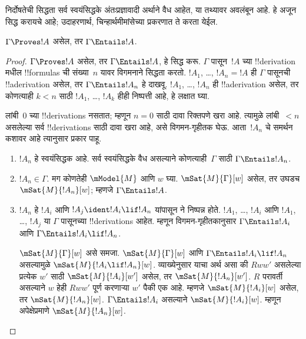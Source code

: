 \documentclass[../../../include/open-logic-section]{subfiles}
\begin{document}


\begin{editorial}
  निर्दोषतेची सिद्धता सर्व स्वयंसिद्धके
  अंतःप्रज्ञावादी अर्थाने वैध आहेत, या
  तथ्यावर अवलंबून आहे. हे अजून सिद्ध
  करायचे आहे; उदाहरणार्थ, चिन्हार्थमीमांसेच्या
  प्रकरणात ते करता येईल.
\end{editorial}

\begin{thm}[निर्दोषता]
  $\Gamma \Proves !A$ असेल, तर
  $ \Gamma \Entails !A$.
\end{thm}

\begin{proof}
  $\Gamma \Proves !A$ असेल, तर
  $\Gamma \Entails !A$, हे सिद्ध करू.
  $\Gamma$ पासून~$!A$ च्या
  !!{derivation} मधील !!{formula}s ची
  संख्या~$n$ यावर विगमनाने सिद्धता करतो.
  $!A_1$, \dots, $!A_n = !A$ ही
  $\Gamma$ पासूनची !!a{derivation} असेल,
  तर $\Gamma \Entails !A_n$ हे दाखवू.
  $!A_1$, \dots, $!A_n$ ही
  !!a{derivation} असेल, तर कोणत्याही $k<n$
  साठी $!A_1$, \dots, $!A_k$ हीही
  निष्पत्ती आहे, हे लक्षात घ्या.

  लांबी~$0$ च्या !!{derivation}s नसतात; म्हणून
  $n=0$ साठी दावा रिक्तपणे खरा आहे.
  त्यामुळे लांबी~$<n$ असलेल्या सर्व
  !!{derivation}s साठी दावा खरा आहे, असे
  विगमन-गृहीतक घेऊ. आता~$!A_n$ चे
  समर्थन कशावर आहे त्यानुसार प्रकार पाहू.

  \begin{enumerate}
  \item $!A_n$ हे स्वयंसिद्धक आहे.
    सर्व स्वयंसिद्धके वैध असल्याने कोणत्याही~$\Gamma$
    साठी $\Gamma \Entails
    !A_n$.
  \item $!A_n \in \Gamma$. मग कोणतेही
    $\mModel{M}$ आणि $w$ घ्या.
    $\mSat{M}{\Gamma}[w]$ असेल, तर उघडच
    $\mSat{M}{!A_n}[w]$; म्हणजे
    $\Gamma \Entails !A$.
  \item $!A_n$ हे $!A_i$ आणि
    $!A_j \ident !A_i \lif
    !A_n$ यांपासून \MP{} ने निष्पन्न होते.
    $!A_1$, \dots, $!A_i$ आणि
    $!A_1$, \dots, $!A_j$ या
    $\Gamma$ पासूनच्या !!{derivation}s आहेत.
    म्हणून विगमन-गृहीतकानुसार
    $\Gamma \Entails !A_i$ आणि
    $\Gamma \Entails !A_i \lif !A_n$.

    $\mSat{M}{\Gamma}[w]$ असे समजा.
    $\mSat{M}{\Gamma}[w]$ आणि
    $\Gamma \Entails !A_i \lif !A_n$
    असल्यामुळे $\mSat{M}{!A_i \lif
      !A_n}[w]$. व्याख्येनुसार याचा अर्थ
    असा की $Rww'$ असलेल्या प्रत्येक $w'$
    साठी $\mSat{M}{!A_i}[w']$ असेल, तर
    $\mSat{M}{!A_n}[w']$. $R$ परावर्ती
    असल्याने $w$ हेही $Rww'$ पूर्ण करणाऱ्या
    $w'$ पैकी एक आहे. म्हणजे
    $\mSat{M}{!A_i}[w]$ असेल, तर
    $\mSat{M}{!A_n}[w]$.
    $\Gamma \Entails !A_i$ असल्याने
    $\mSat{M}{!A_i}[w]$. म्हणून
    अपेक्षेप्रमाणे $\mSat{M}{!A_n}[w]$.
  \end{enumerate}
\end{proof}
\end{document}
